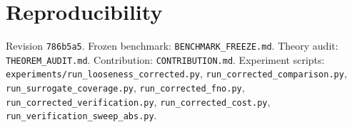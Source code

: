 \documentclass[conference]{IEEEtran}
\theoremstyle{plain}
\theoremstyle{definition}
\begin{document}
\section*{Reproducibility}
Revision \texttt{786b5a5}. Frozen benchmark: \texttt{BENCHMARK\_FREEZE.md}. Theory audit: \texttt{THEOREM\_AUDIT.md}. Contribution: \texttt{CONTRIBUTION.md}. Experiment scripts: \texttt{experiments/run\_looseness\_corrected.py}, \texttt{run\_corrected\_comparison.py}, \texttt{run\_surrogate\_coverage.py}, \texttt{run\_corrected\_fno.py}, \texttt{run\_corrected\_verification.py}, \texttt{run\_corrected\_cost.py}, \texttt{run\_verification\_sweep\_abs.py}.



\end{document}
